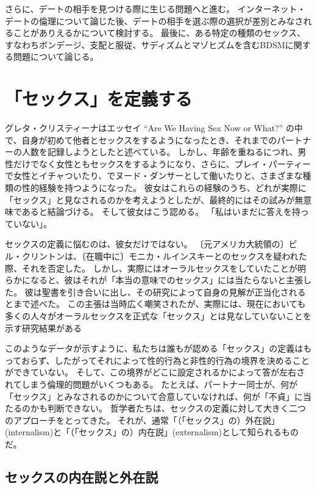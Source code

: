 \documentclass[paper=a4,book,openany]{jlreq} \usepackage{mystyle}
\begin{document}
さらに、デートの相手を見つける際に生じる問題へと進む。
インターネット・デートの倫理について論じた後、デートの相手を選ぶ際の選択が差別とみなされることがありえるかについて検討する。
最後に、ある特定の種類のセックス、すなわちボンデージ、支配と服従、サディズムとマゾヒズムを含むBDSMに関する問題について論じる。

\section{「セックス」を定義する}

グレタ・クリスティーナはエッセイ ``Are We Having Sex Now or What?'' の中で、自身が初めて他者とセックスをするようになったとき、それまでのパートナーの人数を記録しようとしたと述べている。
しかし、年齢を重ねるにつれ、男性だけでなく女性ともセックスをするようになり、さらに、プレイ・パーティーで女性とイチャついたり、でヌード・ダンサーとして働いたりと、さまざまな種類の性的経験を持つようになった。
彼女はこれらの経験のうち、どれが実際に「セックス」と見なされるのかを考えようとしたが、最終的にはその試みが無意味であると結論づける。
そして彼女はこう認める。
「私はいまだに答えを持っていない」\nocite{christina92:_are_we_havin}。

セックスの定義に悩むのは、彼女だけではない。
〔元アメリカ大統領の〕ビル・クリントンは、〔在職中に〕モニカ・ルインスキーとのセックスを疑われた際、それを否定した。
しかし、実際にはオーラルセックスをしていたことが明らかになると、彼はそれが「本当の意味でのセックス」には当たらないと主張した。
彼は聖書を引き合いに出し、その研究によって自身の見解が正当化されるとまで述べた。
この主張は当時広く嘲笑されたが、実際には、現在においても多くの人々がオーラルセックスを正式な「セックス」とは見なしていないことを示す研究結果がある\citep{dotson-blake12:_explor_social_sexual}

このようなデータが示すように、私たちは誰もが認める「セックス」の定義はもっておらず、したがってそれによって性的行為と非性的行為の境界を決めることができていない。
そして、この境界がどこに設定されるかによって答が左右されてしまう倫理的問題がいくつもある。
たとえば、パートナー同士が、何が「セックス」とみなされるのかについて合意していなければ、何が「不貞」に当たるのかも判断できない。
哲学者たちは、セックスの定義に対して大きく二つのアプローチをとってきた。
それが、通常「（「セックス」の）外在説」(internalism)と「（「セックス」の）内在説」(externalism)として知られるものだ。

\subsection{セックスの内在説と外在説}
\end{document}
